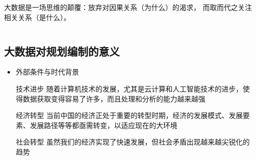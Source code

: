 \documentclass{beamerthemeMono}
\begin{document}
\begin{frame}[t]{\subsecname}
\begin{overlayarea}{\textwidth}{\textheight}
\begin{onlyenv}
\begin{columns}
       \begin{column}{.7\textwidth}
      \begin{ornamentblock}
          \hspace*{2em}大数据是一场思维的颠覆：放弃对因果关系（为什么）的渴求，
而取而代之关注相关关系（是什么）。\\
      \end{ornamentblock}
       \end{column}
     \end{columns}
  \end{onlyenv}
\end{overlayarea}
\end{frame}

\subsection{大数据对规划编制的意义}

\begin{frame}[t]{\subsecname}
\begin{itemize}
\item<1-> 外部条件与时代背景
\pause
\begin{commonbox}{技术进步} 
随着计算机技术的发展，尤其是云计算和人工智能技术的进步，使得数据获取变得容易了许多，而且处理和分析的能力越来越强
\end{commonbox}
\pause 
\begin{commonbox}{经济转型} 
当前中国的经济正处于重要的转型时期，经济的发展模式、发展要素、发展路径等等都亟需转变，以适应现在的大环境
\end{commonbox}
\pause
\begin{commonbox}{社会转型} 
虽然我们的经济实现了快速发展，但社会矛盾出现越来越尖锐化的趋势
\end{commonbox}
\end{itemize}
\end{frame}
\end{document}
